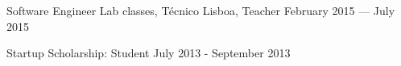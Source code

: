 Software Engineer Lab classes, Técnico Lisboa, Teacher	\hfill February 2015 --- July 2015
 
Startup Scholarship: Student	\hfill July 2013 - September 2013
